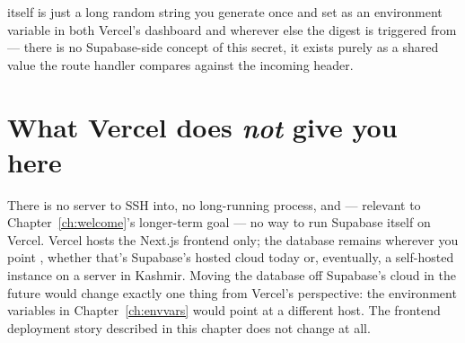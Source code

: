  itself is just a long random string you generate once and set as an environment variable in both Vercel's dashboard and wherever else the digest is triggered from — there is no Supabase-side concept of this secret, it exists purely as a shared value the route handler compares against the incoming  header.

\section{What Vercel does \emph{not} give you here}

There is no server to SSH into, no long-running process, and — relevant to Chapter~\ref{ch:welcome}'s longer-term goal — no way to run Supabase itself on Vercel. Vercel hosts the Next.js frontend only; the database remains wherever you point , whether that's Supabase's hosted cloud today or, eventually, a self-hosted instance on a server in Kashmir. Moving the database off Supabase's cloud in the future would change exactly one thing from Vercel's perspective: the environment variables in Chapter~\ref{ch:envvars} would point at a different host. The frontend deployment story described in this chapter does not change at all.
